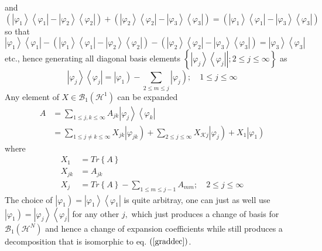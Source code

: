 \documentclass[aps,preprint]{revtex4}%
\begin{document}
and
\begin{equation}
\left(  \left\vert \varphi_{1}\right\rangle \left\langle \varphi
_{1}\right\vert -\left\vert \varphi_{2}\right\rangle \left\langle \varphi
_{2}\right\vert \right)  +\left(  \left\vert \varphi_{2}\right\rangle
\left\langle \varphi_{2}\right\vert -\left\vert \varphi_{3}\right\rangle
\left\langle \varphi_{3}\right\vert \right)  =\left(  \left\vert \varphi
_{1}\right\rangle \left\langle \varphi_{1}\right\vert -\left\vert \varphi
_{3}\right\rangle \left\langle \varphi_{3}\right\vert \right)
\end{equation}
so that
\begin{equation}
\left\vert \varphi_{1}\right\rangle \left\langle \varphi_{1}\right\vert
-\left(  \left\vert \varphi_{1}\right\rangle \left\langle \varphi
_{1}\right\vert -\left\vert \varphi_{2}\right\rangle \left\langle \varphi
_{2}\right\vert \right)  -\left(  \left\vert \varphi_{2}\right\rangle
\left\langle \varphi_{2}\right\vert -\left\vert \varphi_{3}\right\rangle
\left\langle \varphi_{3}\right\vert \right)  =\left\vert \varphi
_{3}\right\rangle \left\langle \varphi_{3}\right\vert
\end{equation}
etc., hence generating all diagonal basis elements $\left\{  \left.
\left\vert \varphi_{j}\right\rangle \left\langle \varphi_{j}\right\vert
\right\vert ;2\leq j\leq\infty\right\}  $ as%
\begin{equation}
\left\vert \varphi_{j}\right\rangle \left\langle \varphi_{j}\right\vert
=\left\vert \varphi_{1}\right)  -\sum_{2\leq m\leq j}\left\vert \varphi
_{j}\right)  ;\quad1\leq j\leq\infty
\end{equation}
Any element of $X\in\mathcal{B}_{1}\left(  \mathcal{H}^{1}\right)  $ can be
expanded%
\begin{align}
A  &  =\sum_{1\leq j,k\leq\infty}A_{jk}\left\vert \varphi_{j}\right\rangle
\left\langle \varphi_{k}\right\vert \\
&  =\sum_{1\leq j\neq k\leq\infty}X_{jk}\left\vert \varphi_{jk}\right)
+\sum_{2\leq j\leq\infty}X_{\mathcal{K}j}\left\vert \varphi_{j}\right)
+X_{1}\left\vert \varphi_{1}\right)
\end{align}
where
\begin{align}
X_{1}  &  =Tr\left\{  A\right\} \nonumber\\
X_{jk}  &  =A_{jk}\nonumber\\
X_{j}  &  =Tr\left\{  A\right\}  -\sum_{1\leq m\leq j-1}A_{mm};\quad2\leq
j\leq\infty
\end{align}
The choice of $\left\vert \varphi_{1}\right)  =\left\vert \varphi
_{1}\right\rangle \left\langle \varphi_{1}\right\vert $ is quite arbitray, one
can just as well use $\left\vert \varphi_{1}\right)  =\left\vert \varphi
_{j}\right\rangle \left\langle \varphi_{j}\right\vert $ for any other $j,$
which just produces a change of basis for $\mathcal{B}_{1}\left(
\mathcal{H}^{N}\right)  $ and hence a change of expansion coefficients while
still produces a decomposition that is isomorphic to eq. $\left(
\ref{graddec}\right)  $.
\end{document}
